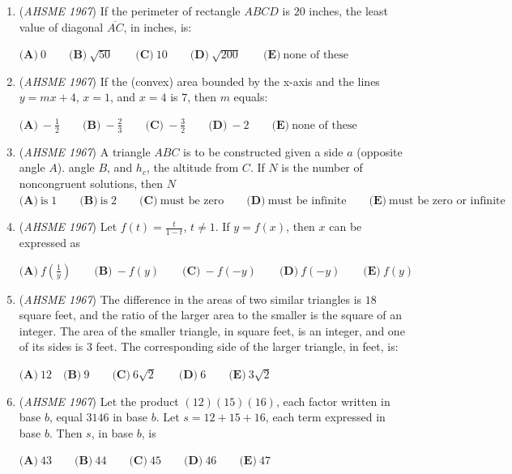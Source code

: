 \begin{enumerate}
	\item (\textit{AHSME 1967}) If the perimeter of rectangle $ABCD$ is $20$ inches, the least value of diagonal $\overline{AC}$, in inches, is:


 $\textbf{(A)}\ 0\qquad \textbf{(B)}\ \sqrt{50}\qquad \textbf{(C)}\ 10\qquad \textbf{(D)}\ \sqrt{200}\qquad \textbf{(E)}\ \text{none of these}$


	\item (\textit{AHSME 1967}) If the (convex) area bounded by the x-axis and the lines $y=mx+4$, $x=1$, and $x=4$ is $7$, then $m$ equals:


 $\textbf{(A)}\ -\frac{1}{2}\qquad \textbf{(B)}\ -\frac{2}{3}\qquad \textbf{(C)}\ -\frac{3}{2} \qquad \textbf{(D)}\ -2 \qquad \textbf{(E)}\ \text{none of these}$


	\item (\textit{AHSME 1967}) A triangle $ABC$ is to be constructed given a side $a$ (opposite angle $A$). angle $B$, and $h_c$, the altitude from $C$.  If $N$ is the number of noncongruent solutions, then $N$
$\textbf{(A)}\ \text{is} \; 1\qquad \textbf{(B)}\ \text{is} \; 2\qquad \textbf{(C)}\ \text{must be zero}\qquad \textbf{(D)}\ \text{must be infinite}\qquad \textbf{(E)}\ \text{must be zero or infinite}$


	\item (\textit{AHSME 1967}) Let $f(t)=\frac{t}{1-t}$, $t \not= 1$.  If $y=f(x)$, then $x$ can be expressed as 


 $\textbf{(A)}\ f\left(\frac{1}{y}\right)\qquad \textbf{(B)}\ -f(y)\qquad \textbf{(C)}\ -f(-y)\qquad \textbf{(D)}\ f(-y)\qquad \textbf{(E)}\ f(y)$


	\item (\textit{AHSME 1967}) The difference in the areas of two similar triangles is $18$ square feet, and the ratio of the larger area to the smaller is the square of an integer.  The area of the smaller triangle, in square feet, is an integer, and one of its sides is $3$ feet.  The corresponding side of the larger triangle, in feet, is:


 $\textbf{(A)}\ 12\quad \textbf{(B)}\ 9\qquad \textbf{(C)}\ 6\sqrt{2}\qquad \textbf{(D)}\ 6\qquad \textbf{(E)}\ 3\sqrt{2}$


	\item (\textit{AHSME 1967}) Let the product $(12)(15)(16)$, each factor written in base $b$, equal $3146$ in base $b$.  Let $s=12+15+16$, each term expressed in base $b$.  Then $s$, in base $b$, is 


 $\textbf{(A)}\ 43\qquad \textbf{(B)}\ 44\qquad \textbf{(C)}\ 45\qquad \textbf{(D)}\ 46\qquad \textbf{(E)}\ 47$



\end{enumerate}
